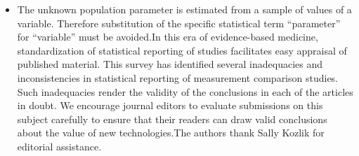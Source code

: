 \documentclass[]{article}
\begin{document}
\begin{itemize}
\item The unknown population parameter is estimated from a sample of values of a variable. Therefore substitution of the specific statistical term “parameter” for “variable” must be avoided.In this era of evidence-based medicine, standardization of statistical reporting of studies facilitates easy appraisal of published material. This survey has identified several inadequacies and inconsistencies in statistical reporting of measurement comparison studies. Such inadequacies render the validity of the conclusions in each of the articles in doubt. We encourage journal editors to evaluate submissions on this subject carefully to ensure that their readers can draw valid conclusions about the value of new technologies.The authors thank Sally Kozlik for editorial assistance.
\end{itemize}
\end{document}
